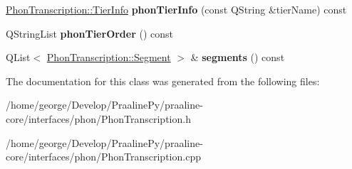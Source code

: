 \begin{DoxyCompactItemize}
\mbox{\label{class_phon_transcription_a6e8967c51c66dd0b2f30616038d134d4}} 
\hyperlink{class_phon_transcription_1_1_tier_info}{Phon\+Transcription\+::\+Tier\+Info} {\bfseries phon\+Tier\+Info} (const Q\+String \&tier\+Name) const
\item 
\mbox{\label{class_phon_transcription_adaa831798615f1067fa588a99d7a3165}} 
Q\+String\+List {\bfseries phon\+Tier\+Order} () const
\item 
\mbox{\label{class_phon_transcription_a486d54c141a57908d5f7ef4485df3384}} 
Q\+List$<$ \hyperlink{class_phon_transcription_1_1_segment}{Phon\+Transcription\+::\+Segment} $>$ \& {\bfseries segments} () const
\end{DoxyCompactItemize}


The documentation for this class was generated from the following files\+:\begin{DoxyCompactItemize}
\item 
/home/george/\+Develop/\+Praaline\+Py/praaline-\/core/interfaces/phon/Phon\+Transcription.\+h\item 
/home/george/\+Develop/\+Praaline\+Py/praaline-\/core/interfaces/phon/Phon\+Transcription.\+cpp\end{DoxyCompactItemize}
